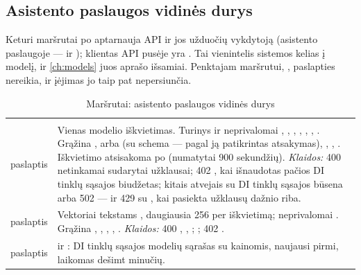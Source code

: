 \subsection{Asistento paslaugos vidinės durys}\label{sec:api:door-assistant}

Keturi maršrutai po  aptarnauja API ir jos užduočių vykdytoją (asistento
paslaugoje ---  ir ); klientas API pusėje
yra . Tai vienintelis sistemos kelias į modelį, ir \cref{ch:models}
juos aprašo išsamiai. Penktajam maršrutui, , paslapties nereikia, ir įėjimas jo taip
pat nepersiunčia.

\begin{xltabular}{\textwidth}{@{}L{19mm}Y@{}}
\caption{Maršrutai: asistento paslaugos vidinės durys}\label{tab:api:door-assistant}\\
\toprule {} &  \\ \midrule \endfirsthead
\toprule {} &  \\ \midrule \endhead
\bottomrule \endlastfoot
{}
paslaptis & Vienas modelio iškvietimas. Turinys  ir neprivalomai ,
  , , , , ,
  . Grąžina ,  arba  (su schema ---
  pagal ją patikrintas atsakymas), , , .
  Iškvietimo atsisakoma po  (numatytai 900 sekundžių).
  \emph{Klaidos:} 400 netinkamai sudarytai užklausai; 402 , kai
  išnaudotas pačios DI tinklų sąsajos biudžetas; kitais atvejais  su DI
  tinklų sąsajos būsena arba 502 --- ir 429 su , kai pasiekta užklausų dažnio
  riba. \\
\addlinespace
{}
paslaptis & Vektoriai tekstams , daugiausia 256 per iškvietimą; neprivalomai
  . Grąžina , , , ,
  . \emph{Klaidos:} 400 , ,
  ; ; 402 . \\
\addlinespace
{}
paslaptis &  ir : DI tinklų sąsajos modelių sąrašas su kainomis,
  naujausi pirmi, laikomas dešimt minučių. \\

\end{xltabular}
